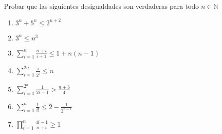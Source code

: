 \begin{enunciado}{\ejercicio}
Probar que las siguientes desigualdades son verdaderas para todo $n \in \mathbb{N}$
\begin{multicols}{2}
    \begin{enumerate}[label=\roman*)]
        \item $3^n + 5^n \leq 2^{n+2}$ 
        \item $3^n \leq n^3$ 
        \item $\displaystyle \sum_{i=1}^{n} \frac{n+i}{i+1} \leq 1 + n(n-1)$ 
        \item $\displaystyle \sum_{i=1}^{2n} \frac{i}{2^i} \leq n$
        \item $\displaystyle \sum_{i=1}^{2^n} \frac{1}{2i-1} > \frac{n+3}{4}$
        \item $\displaystyle \sum_{i=1}^{n} \frac{1}{i!} \leq 2 - \frac{1}{2^{n-1}}$
        \item $\displaystyle \prod_{i=1}^{n} \frac{4i-1}{n+i} \geq 1$
    \end{enumerate}
\end{multicols}
\end{enunciado}

